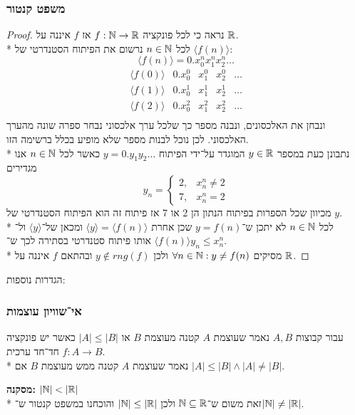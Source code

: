 \subsubsection{משפט קנטור}
\begin{proof}
	נראה כי לכל פונקציה $f : \mathbb{N} \to \mathbb{R}$ אז $f$ איננה על $\mathbb{R}$. \\*
	לכל $n \in \mathbb{N}$ נרשום את הפיתוח הסטנדרטי של $\langle f(n) \rangle$:
	\[
		\langle f(n) \rangle = 0.x_0^n x_1^n x_2^n \hdots
	\]
	\[
		\begin{matrix}
			\langle f(0) \rangle & 0.x_0^0 & x_1^0 & x_2^0 & \hdots \\
			\langle f(1) \rangle & 0.x_0^1 & x_1^1 & x_2^1 & \hdots \\
			\langle f(2) \rangle & 0.x_0^2 & x_1^2 & x_2^2 & \hdots \\
		\end{matrix}
	\]
	ונבחן את האלכסונים, ונבנה מספר כך שלכל ערך אלכסוני נבחר ספרה שונה מהערך האלכסוני. לכן נוכל לבנות מספר שלא מופיע בכלל ברשימה הזו. \\*
	נתבונן כעת במספר $y \in \mathbb{R}$ המוגדר על־ידי הפיתוח $y = 0.y_1 y_2 \hdots$ כאשר לכל $n \in \mathbb{N}$ אנו מגדירים
	\[
		y_n = \begin{cases}
			2, & x_n^n \ne 2 \\
			7, & x_n^n = 2
		\end{cases}
	\]
	מכיוון שכל הספרות בפיתוח הנתון הן 2 או 7 אז פיתוח זה הוא הפיתוח הסטנדרטי של $y$. \\*
	לכל $n \in \mathbb{N}$ לא יתכן ש־$y = f(n)$ שכן אחרת $\langle y \rangle = \langle f(n) \rangle$ ומכאן של־$\langle y \rangle$ ול־$\langle f(n) \rangle$ אותו פיתוח סטנדרטי בסתירה לכך ש־$y_n \le x_n^n$. \\*
	מסיקים $\forall n \in \mathbb{N} : y \ne f(n)$ ולכן $y \not\in rng(f)$ ובהתאם $f$ איננה על $\mathbb{R}$.
\end{proof}

הגדרות נוספות:
\subsubsection{אי־שוויון עוצמות}
עבור קבוצות $A, B$ נאמר שעוצמת $A$ קטנה מעוצמת $B$ או $|A| \le |B|$ כאשר יש פונקציה חד־חד ערכית $f : A \to B$. \\*
נאמר שעוצמת $A$ קטנה ממש מעוצמת $B$ אם $|A| \le |B| \land |A| \ne |B|$.

\textbf{מסקנה:} $|\mathbb{N}| < |\mathbb{R}|$ \\*
זאת משום ש־$\mathbb{N} \subseteq \mathbb{R}$ ולכן $|\mathbb{N}| \le |\mathbb{R}|$ והוכחנו במשפט קנטור ש־$|\mathbb{N}| \ne |\mathbb{R}|$.


